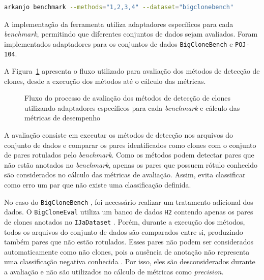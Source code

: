 \documentclass[twocolumn]{article}
\begin{document}
\begin{minipage}{0.9\columnwidth}
    \centering
\begin{lstlisting}[style=macrocode,numbers=none,language=bash,morekeywords={arkanjo},caption={\textit{Benchmark} para avaliação dos métodos de detecção de clones utilizando uma base de dados definida.}]
arkanjo benchmark --methods="1,2,3,4" --dataset="bigclonebench"
\end{lstlisting}
\end{minipage}

A implementação da ferramenta utiliza adaptadores específicos para cada \textit{benchmark}, permitindo que diferentes conjuntos de dados sejam avaliados. Foram implementados adaptadores para os conjuntos de dados \texttt{BigCloneBench} e \texttt{POJ-104}.

A Figura~\ref{fig:benchmark} apresenta o fluxo utilizado para avaliação dos métodos de detecção de clones, desde a execução dos métodos até o cálculo das métricas.

\begin{figure}[ht]
    \centering
    \caption{Fluxo do processo de avaliação dos métodos de detecção de clones utilizando adaptadores específicos para cada \textit{benchmark} e cálculo das métricas de desempenho}
    \label{fig:benchmark}
\end{figure}

A avaliação consiste em executar os métodos de detecção nos arquivos do conjunto de dados e comparar os pares identificados como clones com o conjunto de pares rotulados pelo \textit{benchmark}. Como os métodos podem detectar pares que não estão anotados no \textit{benchmark}, apenas os pares que possuem rótulo conhecido são considerados no cálculo das métricas de avaliação. Assim, evita classificar como erro um par que não existe uma classificação definida.

No caso do \texttt{BigCloneBench} \cite{svajlenko2014bigclonebench}, foi necessário realizar um tratamento adicional dos dados. O \texttt{BigCloneEval} \cite{svajlenko2016bigcloneeval} utiliza um banco de dados \texttt{H2} contendo apenas os pares de clones anotados no \texttt{IJaDataset} \cite{ijadataset}. Porém, durante a execução dos métodos, todos os arquivos do conjunto de dados são comparados entre si, produzindo também pares que não estão rotulados. Esses pares não podem ser considerados automaticamente como não clones, pois a ausência de anotação não representa uma classificação negativa conhecida \cite{krinke2022bigclonebench}. Por isso, eles são desconsiderados durante a avaliação e não são utilizados no cálculo de métricas como \textit{precision}.
\end{document}
